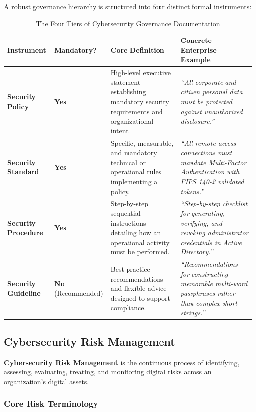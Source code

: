 A robust governance hierarchy is structured into four distinct formal instruments:

\begin{table}[htbp]
\centering
\caption{The Four Tiers of Cybersecurity Governance Documentation}
\label{tab:governance_instruments}
\begin{tabularx}{\textwidth}{p{2.5cm} p{2.2cm} X X}
\toprule
\textbf{Instrument} & \textbf{Mandatory?} & \textbf{Core Definition} & \textbf{Concrete Enterprise Example} \\
\midrule
\textbf{Security Policy} & \textbf{Yes} & High-level executive statement establishing mandatory security requirements and organizational intent. & \textit{``All corporate and citizen personal data must be protected against unauthorized disclosure.''} \\
\textbf{Security Standard} & \textbf{Yes} & Specific, measurable, and mandatory technical or operational rules implementing a policy. & \textit{``All remote access connections must mandate Multi-Factor Authentication with FIPS 140-2 validated tokens.''} \\
\textbf{Security Procedure} & \textbf{Yes} & Step-by-step sequential instructions detailing how an operational activity must be performed. & \textit{``Step-by-step checklist for generating, verifying, and revoking administrator credentials in Active Directory.''} \\
\textbf{Security Guideline} & \textbf{No} (Recommended) & Best-practice recommendations and flexible advice designed to support compliance. & \textit{``Recommendations for constructing memorable multi-word passphrases rather than complex short strings.''} \\
\bottomrule
\end{tabularx}
\end{table}

\subsection{Cybersecurity Risk Management}

\textbf{Cybersecurity Risk Management} is the continuous process of identifying, assessing, evaluating, treating, and monitoring digital risks across an organization's digital assets.

\subsubsection{Core Risk Terminology}

